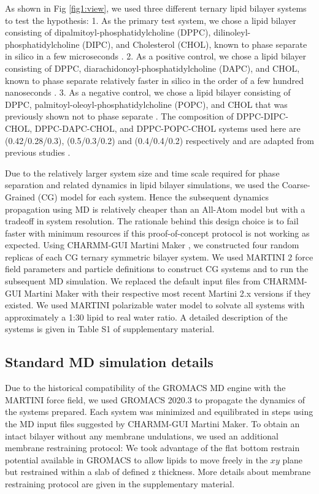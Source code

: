 \documentclass{biophys-new}
\begin{document}
As shown in Fig \ref{fig1:view}, we used three different ternary lipid bilayer systems to test the hypothesis:
1. As the primary test system, we chose a lipid bilayer consisting of dipalmitoyl-phosphatidylcholine (DPPC), dilinoleyl-phosphatidylcholine (DIPC), and Cholesterol (CHOL), known to phase separate in silico in a few microseconds \cite{Risselada2008, Schafer2010, Janosi2012, Doma2012, Jong2013, Liu2020, Su2020}.
2. As a positive control, we chose a lipid bilayer consisting of DPPC, diarachidonoyl-phosphatidylcholine (DAPC), and CHOL, known to phase separate relatively faster in silico in the order of a few hundred nanoseconds \cite{Lin2016, Lin2019, Davis2013a}.
3. As a negative control, we chose a lipid bilayer consisting of DPPC, palmitoyl-oleoyl-phosphatidylcholine (POPC), and CHOL that was previously shown not to phase separate \cite{Veatch2003,Davis2013a}.
The composition of DPPC-DIPC-CHOL, DPPC-DAPC-CHOL, and DPPC-POPC-CHOL systems used here are (0.42/0.28/0.3), (0.5/0.3/0.2) and (0.4/0.4/0.2) respectively and are adapted from previous studies \cite{Risselada2008, Lin2016, Davis2013a}.

Due to the relatively larger system size and time scale required for phase separation and related dynamics in lipid bilayer simulations, we used the Coarse-Grained (CG) model for each system. Hence the subsequent dynamics propagation using MD is relatively cheaper than an All-Atom model but with a tradeoff in system resolution.
The rationale behind this design choice is to fail faster with minimum resources if this proof-of-concept protocol is not working as expected. 
Using CHARMM-GUI Martini Maker \cite{Qi2015}, we constructed four random replicas of each CG ternary symmetric bilayer system.
We used MARTINI 2 force field parameters and particle definitions\cite{Marrink2007, DeJong2013} to construct CG systems and to run the subsequent MD simulation.
We replaced the default input files from CHARMM-GUI Martini Maker with their respective most recent Martini 2.x versions if they existed.
We used MARTINI polarizable water model\cite{Yesylevskyy2010} to solvate all systems with approximately a 1:30 lipid to real water ratio.
A detailed description of the systems is given in Table S1 of supplementary material.

\subsection*{Standard MD simulation details}

Due to the historical compatibility of the GROMACS MD engine with the MARTINI force field, we used GROMACS 2020.3\cite{Abraham2015} to propagate the dynamics of the systems prepared. 
Each system was minimized and equilibrated in steps using the MD input files suggested by CHARMM-GUI Martini Maker.
To obtain an intact bilayer without any membrane undulations, we used an additional membrane restraining protocol: 
We took advantage of the flat bottom restrain potential available in GROMACS to allow lipids to move freely in the $xy$ plane but restrained within a slab of defined z thickness.
More details about membrane restraining protocol are given in the supplementary material.
\end{document}
